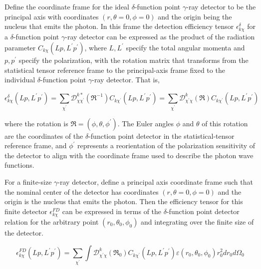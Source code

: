 \documentclass[10pt]{article}
\begin{document}
Define the coordinate frame for the ideal $\delta$-function point $\gamma$-ray detector to be the principal axis with coordinates $(r, \theta=0, \phi=0)$ and the origin being the nucleus that emits the photon. In this frame the detection efficiency tensor $\epsilon_{k \chi}^{\delta}$ for a $\delta$-function point $\gamma$-ray detector can be expressed as the product of the radiation parameter $C_{k \chi}\left(L p, L^{\prime} p^{\prime}\right)$, where $L, L^{\prime}$ specify the total angular momenta and $p, p^{\prime}$ specify the polarization, with the rotation matrix that transforms from the statistical tensor reference frame to the principal-axis frame fixed to the individual $\delta$-function point $\gamma$-ray detector. That is,


\begin{equation*}
\epsilon_{k \chi}^{\delta}\left(L p, L^{\prime} p^{\prime}\right)=\sum_{\chi^{\prime}} \mathcal{D}_{\chi \chi^{\prime}}^{k *}\left(\Re^{-1}\right) C_{k \chi^{\prime}}\left(L p, L^{\prime} p^{\prime}\right)=\sum_{\chi^{\prime}} \mathcal{D}_{\chi^{\prime} \chi}^{k}(\Re) C_{k \chi^{\prime}}\left(L p, L^{\prime} p^{\prime}\right) \tag{4.37}
\end{equation*}


where the rotation is $\Re=\left(\phi, \theta, \phi^{\prime}\right)$. The Euler angles $\phi$ and $\theta$ of this rotation are the coordinates of the $\delta$-function point detector in the statistical-tensor reference frame, and $\phi^{\prime}$ represents a reorientation of the polarization sensitivity of the detector to align with the coordinate frame used to describe the photon wave functions.

For a finite-size $\gamma$-ray detector, define a principal axis coordinate frame such that the nominal center of the detector has coordinates $(r, \theta=0, \phi=0)$ and the origin is the nucleus that emits the photon. Then the efficiency tensor for this finite detector $\epsilon_{k \chi}^{F D}$ can be expressed in terms of the $\delta$-function point detector relation for the arbitrary point $\left(r_{0}, \theta_{0}, \phi_{0}\right)$ and integrating over the finite size of the detector.


\begin{equation*}
\epsilon_{k \chi}^{F D}\left(L p, L^{\prime} p^{\prime}\right)=\sum_{\chi^{\prime}} \int \mathcal{D}_{\chi^{\prime} \chi}^{k}\left(\Re_{0}\right) C_{k \chi^{\prime}}\left(L p, L^{\prime} p^{\prime}\right) \varepsilon\left(r_{0}, \theta_{0}, \phi_{0}\right) r_{0}^{2} d r_{0} d \Omega_{0} \tag{4.38}
\end{equation*}
\end{document}
